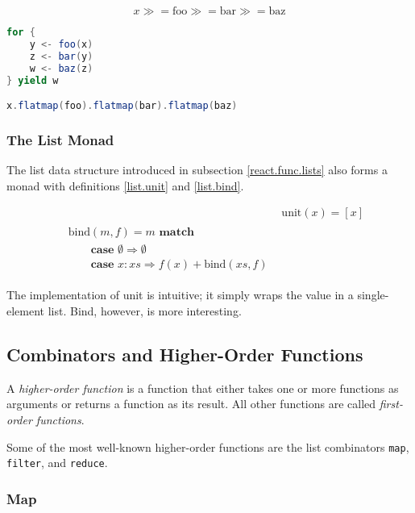 \begin{equation}
x \gg= \text{foo} \gg= \text{bar} \gg= \text{baz}
\end{equation}

\begin{code}
\begin{lstlisting}[language=Scala]
for {
    y <- foo(x)
    z <- bar(y)
    w <- baz(z)
} yield w

x.flatmap(foo).flatmap(bar).flatmap(baz)
\end{lstlisting}
\end{code}

\subsubsection{The List Monad}

The list data structure introduced in subsection \ref{react.func.lists} also forms a monad with definitions \ref{list.unit} and \ref{list.bind}.

\begin{align}
& \text{unit}(x) = [x] \label{list.unit}\\
\begin{split} \label{list.bind}
& \text{bind}(m, f) = m \textbf{ match} \\
& \quad\quad \textbf{case } \emptyset \Rightarrow \emptyset \\
& \quad\quad \textbf{case } x : xs \Rightarrow f(x) + \text{bind}(xs, f)
\end{split}
\end{align}

The implementation of unit is intuitive; it simply wraps the value in a single-element list. Bind, however, is more interesting.

\subsection{Combinators and Higher-Order Functions}

A \emph{higher-order function} is a function that either takes one or more functions as arguments or returns a function as its result. All other functions are called \emph{first-order functions}.

Some of the most well-known higher-order functions are the list combinators \texttt{map}, \texttt{filter}, and \texttt{reduce}.

\subsubsection{Map}

